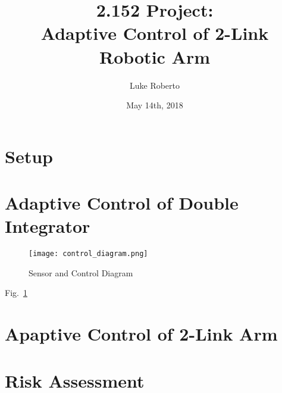 \documentclass[12pt]{article}
\title{\Large \bf 2.152 Project: \\ Adaptive Control of 2-Link Robotic Arm}
\author{\vspace{-6em}Luke Roberto}
\date{\vspace{-6em}May 14th, 2018}
\begin{document}
\vspace{-2em}

\section{Setup}


\section{Adaptive Control of Double Integrator}


\begin{figure}[h!]
    \centering
    \texttt{[image: control\_diagram.png]}
    \caption{Sensor and Control Diagram}
    \label{fig:control_diagram}
\end{figure}

\noindent
Fig.~\ref{fig:control_diagram}
\\

\section{Apaptive Control of 2-Link Arm}


\section{Risk Assessment}
\end{document}
